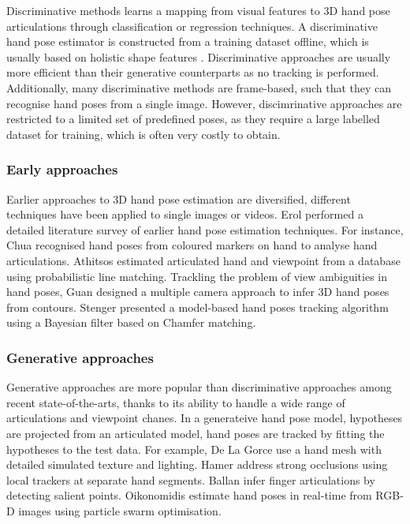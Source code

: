 Discriminative methods learns a mapping from visual features to 3D hand pose articulations through classification or regression techniques. A discriminative hand pose estimator is constructed from a training dataset offline, which is usually based on holistic shape features \cite{Rosales2001, Athitsos2003, Romero2009, Wang2009, Keskin2012}. Discriminative approaches are usually more efficient than their generative counterparts as no tracking is performed. Additionally, many discriminative methods are frame-based, such that they can recognise hand poses from a single image. However, discimrinative approaches are restricted to a limited set of predefined poses, as they require a large labelled dataset for training, which is often very costly to obtain.  

\subsubsection{Early approaches} 
Earlier approaches to 3D hand pose estimation are diversified, different techniques have been applied to single images or videos. Erol \etal \cite{Erol2007} performed a detailed literature survey of earlier hand pose estimation techniques. For instance, Chua \etal \cite{Chua2002} recognised hand poses from coloured markers on hand to analyse hand articulations. Athitsos \etal \cite{Athitsos2003} estimated articulated hand and viewpoint from a database using probabilistic line matching. Trackling the problem of view ambiguities in hand poses, Guan \etal \cite{Guan2006} designed a multiple camera approach to infer 3D hand poses from contours. Stenger \etal \cite{Stenger2006} presented a model-based hand poses tracking algorithm using a Bayesian filter based on Chamfer matching.  

\subsubsection{Generative approaches} 
Generative approaches are more popular than discriminative approaches among recent state-of-the-arts, thanks to its ability to handle a wide range of articulations and viewpoint chanes.   
In a generateive hand pose model, hypotheses are projected from an articulated model, hand poses are tracked by fitting the hypotheses to the test data. 
For example, De La Gorce \etal \cite{LaGorce2011} use a hand mesh with detailed simulated texture and lighting. 
Hamer \etal \cite{Hamer2009} address strong occlusions using local trackers at separate hand segments. 
Ballan \etal \cite{Ballan2012} infer finger articulations by detecting salient points.  
Oikonomidis \etal \cite{Oikonomidis2011} estimate hand poses in real-time from RGB-D images using particle swarm optimisation. 

